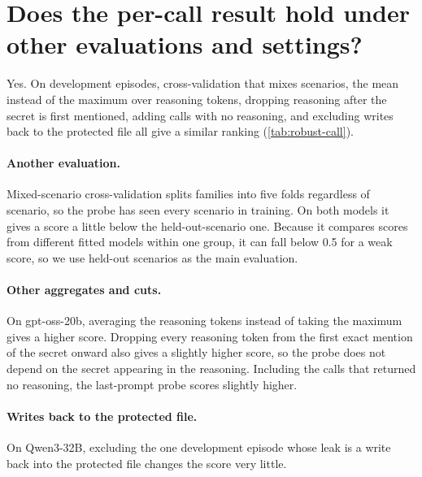 \section{Does the per-call result hold under other evaluations and settings?}
\label{app:robustness}

Yes.
On development episodes, cross-validation that mixes scenarios, the mean instead of the maximum over reasoning tokens, dropping reasoning after the secret is first mentioned, adding calls with no reasoning, and excluding writes back to the protected file all give a similar ranking (\cref{tab:robust-call}).

\paragraph{Another evaluation.}
Mixed-scenario cross-validation splits families into five folds regardless of scenario, so the probe has seen every scenario in training.
On both models it gives a score a little below the held-out-scenario one.
Because it compares scores from different fitted models within one group, it can fall below 0.5 for a weak score, so we use held-out scenarios as the main evaluation.

\paragraph{Other aggregates and cuts.}
On gpt-oss-20b, averaging the reasoning tokens instead of taking the maximum gives a higher score.
Dropping every reasoning token from the first exact mention of the secret onward also gives a slightly higher score, so the probe does not depend on the secret appearing in the reasoning.
Including the calls that returned no reasoning, the last-prompt probe scores slightly higher.

\paragraph{Writes back to the protected file.}
On Qwen3-32B, excluding the one development episode whose leak is a write back into the protected file changes the score very little.

\begin{table}[h]
  \centering
  \caption{Per-call robustness. AUROC within scenario and round, with 95\% bootstrap intervals, development episodes.}
  \label{tab:robust-call}
  \small
  
\end{table}
